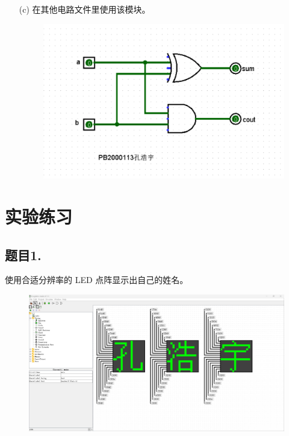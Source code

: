 \documentclass{article}
\begin{document}
\begin{enumerate}
\begin{figure}[H]
			\end{figure}
			\item [(c)]在其他电路文件里使用该模块。
			\begin{figure}[H]
				\centering
				\includegraphics[scale=0.8]{b-5.png}
			\end{figure}
		\end{enumerate}
    \section{实验练习}
		\subsection*{题目1.}使用合适分辨率的 LED 点阵显示出自己的姓名。
		\begin{figure}[H]
			\centering
			\includegraphics[scale=0.16]{1-1.png}
		\end{figure}
\end{document}
